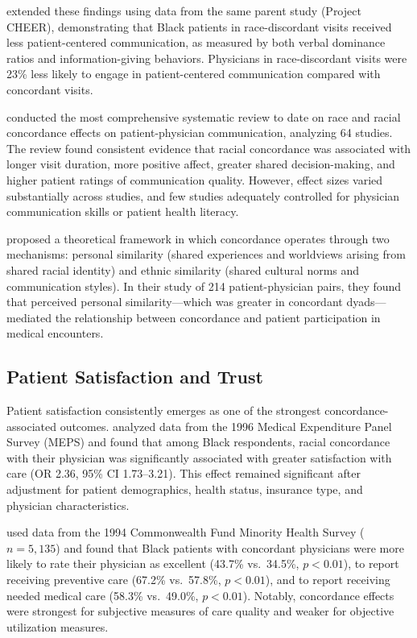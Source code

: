 \documentclass[12pt]{article}
\begin{document}
\citet{johnson2004} extended these findings using data from the same parent study (Project CHEER), demonstrating that Black patients in race-discordant visits received less patient-centered communication, as measured by both verbal dominance ratios and information-giving behaviors. Physicians in race-discordant visits were 23\% less likely to engage in patient-centered communication compared with concordant visits.

\citet{shen2018} conducted the most comprehensive systematic review to date on race and racial concordance effects on patient-physician communication, analyzing 64 studies. The review found consistent evidence that racial concordance was associated with longer visit duration, more positive affect, greater shared decision-making, and higher patient ratings of communication quality. However, effect sizes varied substantially across studies, and few studies adequately controlled for physician communication skills or patient health literacy.

\citet{street2008} proposed a theoretical framework in which concordance operates through two mechanisms: personal similarity (shared experiences and worldviews arising from shared racial identity) and ethnic similarity (shared cultural norms and communication styles). In their study of 214 patient-physician pairs, they found that perceived personal similarity---which was greater in concordant dyads---mediated the relationship between concordance and patient participation in medical encounters.

\subsection{Patient Satisfaction and Trust}

Patient satisfaction consistently emerges as one of the strongest concordance-associated outcomes. \citet{laveist2002} analyzed data from the 1996 Medical Expenditure Panel Survey (MEPS) and found that among Black respondents, racial concordance with their physician was significantly associated with greater satisfaction with care (OR 2.36, 95\% CI 1.73--3.21). This effect remained significant after adjustment for patient demographics, health status, insurance type, and physician characteristics.

\citet{saha1999} used data from the 1994 Commonwealth Fund Minority Health Survey ($n = 5{,}135$) and found that Black patients with concordant physicians were more likely to rate their physician as excellent (43.7\% vs.\ 34.5\%, $p < 0.01$), to report receiving preventive care (67.2\% vs.\ 57.8\%, $p < 0.01$), and to report receiving needed medical care (58.3\% vs.\ 49.0\%, $p < 0.01$). Notably, concordance effects were strongest for subjective measures of care quality and weaker for objective utilization measures.
\end{document}
